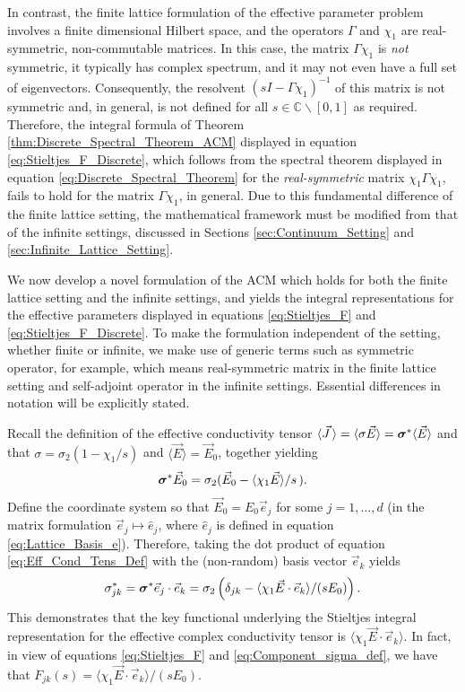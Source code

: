 \documentclass{cmslatex}
\newcommand\bsig{\mbox{\boldmath${\sigma}$}}
\begin{document}
In contrast, the finite lattice formulation of the effective parameter
problem involves a finite dimensional Hilbert space, and the operators
$\Gamma$ and $\chi_1$ are real-symmetric, non-commutable matrices. In this
case, the matrix $\Gamma\chi_1$ is \emph{not} symmetric, it typically has
complex spectrum, and it may not even have a full set of
eigenvectors. Consequently, the resolvent $(sI-\Gamma\chi_1)^{-1}$ of this
matrix is not symmetric and, in general, is 
not defined for all $s\in\mathbb{C}\backslash[0,1]$ as required. Therefore, the
integral formula of Theorem \ref{thm:Discrete_Spectral_Theorem_ACM}
displayed in equation \eqref{eq:Stieltjes_F_Discrete}, which follows
from the spectral theorem displayed in equation
\eqref{eq:Discrete_Spectral_Theorem} for the
\emph{real-symmetric} matrix $\chi_1\Gamma\chi_1$, fails to hold for the matrix
$\Gamma\chi_1$, in general. Due to this fundamental difference of the finite
lattice setting, the mathematical framework must be 
modified from that of the infinite settings, discussed in Sections
\ref{sec:Continuum_Setting} and \ref{sec:Infinite_Lattice_Setting}.



We now develop a novel formulation of the ACM which holds for both the
finite lattice setting and the infinite settings, and yields the
integral representations for the effective parameters displayed in
equations \eqref{eq:Stieltjes_F} and
\eqref{eq:Stieltjes_F_Discrete}. To make the formulation independent
of the setting, whether finite or infinite, we make use of generic
terms such as symmetric operator, for example, which means
real-symmetric matrix in the finite lattice setting and self-adjoint
operator in the infinite settings. Essential differences in notation
will be explicitly stated.



Recall the definition of the effective conductivity tensor
$\langle\vec{J}\,\rangle=\langle\sigma\vec{E}\rangle=\bsig^*\langle\vec{E}\rangle$ and that $\sigma=\sigma_2(1-\chi_1/s)$ and
$\langle\vec{E}\rangle=\vec{E}_0$, together yielding  
% 
\begin{align}\label{eq:Eff_Cond_Tens_Def}
  \bsig^*\vec{E}_0=\sigma_2(\vec{E}_0 -\langle\chi_1\vec{E}\rangle/s\,).
\end{align}
%
Define the coordinate system so that $\vec{E}_0=E_0\vec{e}_j$ for
some $j=1,\ldots,d$ (in the matrix formulation
$\vec{e}_j\mapsto\hat{e}_j$, where $\hat{e}_j$ is defined in equation
\eqref{eq:Lattice_Basis_e}). Therefore, taking the dot product of
equation  \eqref{eq:Eff_Cond_Tens_Def} with the (non-random) basis vector
$\vec{e}_k$ yields 
%
\begin{align}\label{eq:Component_sigma_def}
  \sigma^*_{jk}=\bsig^*\vec{e}_j\cdot\vec{e}_k=\sigma_2\left(\delta_{jk}-\langle\chi_1\vec{E}\cdot\vec{e}_k\rangle/(sE_0)\right). 
\end{align}
%
This demonstrates that the key functional underlying the Stieltjes
integral representation for the effective complex conductivity tensor
is $\langle\chi_1\vec{E}\cdot\vec{e}_k\rangle$. In fact, in view of equations
\eqref{eq:Stieltjes_F} and \eqref{eq:Component_sigma_def}, we have
that $F_{jk}(s)=\langle\chi_1\vec{E}\cdot\vec{e}_k\rangle/(sE_0)$. 
\end{document}
